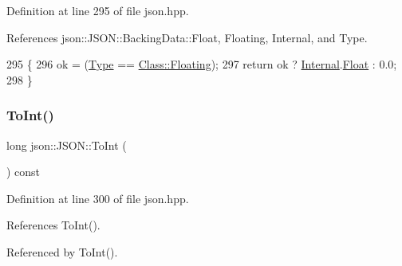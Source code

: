 Definition at line 295 of file json.\+hpp.



References json\+::\+J\+S\+O\+N\+::\+Backing\+Data\+::\+Float, Floating, Internal, and Type.


\begin{DoxyCode}
295                                          \{
296             ok = (\mbox{\hyperlink{classjson_1_1_j_s_o_n_a3fa6923afa41bdfe38077fbc0079aaf5}{Type}} == \mbox{\hyperlink{classjson_1_1_j_s_o_n_a762f55df6d407c1af61607ed516ffe07ac8df43648942ec3a9aec140f07f47b7c}{Class::Floating}});
297             \textcolor{keywordflow}{return} ok ? \mbox{\hyperlink{classjson_1_1_j_s_o_n_a1e2a064794c3d55c8bb8887fc5734947}{Internal}}.\mbox{\hyperlink{unionjson_1_1_j_s_o_n_1_1_backing_data_aac4950afa6b9205bb367a33de47faa5c}{Float}} : 0.0;
298         \}
\end{DoxyCode}
\mbox{\label{classjson_1_1_j_s_o_n_a867eb9869140b69428287c98d4f56388}} 
\subsubsection{\texorpdfstring{To\+Int()}{ToInt()}\hspace{0.1cm}{\footnotesize\ttfamily [1/2]}}
{\footnotesize\ttfamily long json\+::\+J\+S\+O\+N\+::\+To\+Int (\begin{DoxyParamCaption}{ }\end{DoxyParamCaption}) const\hspace{0.3cm}{\ttfamily [inline]}}



Definition at line 300 of file json.\+hpp.



References To\+Int().



Referenced by To\+Int().


